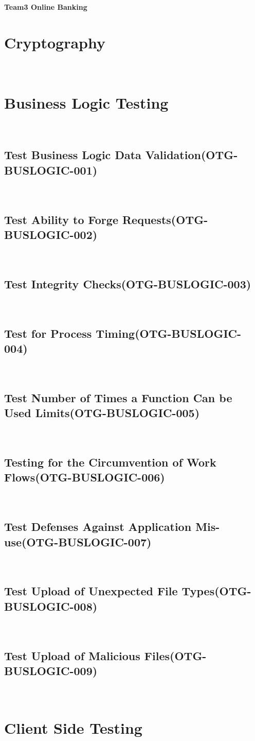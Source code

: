 \documentclass[headsepline,footsepline,footinclude=false,oneside,fontsize=11pt,paper=a4,listof=totoc,bibliography=totoc]{scrbook} %
\begin{document}
\textbf{Team3 Online Banking}


\section{Cryptography}\
 
\pagebreak 
\section{Business Logic Testing}\
\subsection{Test Business Logic Data Validation(OTG-BUSLOGIC-001)}\
\pagebreak 
\subsection{Test Ability to Forge Requests(OTG-BUSLOGIC-002)}\
\pagebreak 
\subsection{Test Integrity Checks(OTG-BUSLOGIC-003)}\
\pagebreak 
\subsection{Test for Process Timing(OTG-BUSLOGIC-004)}\
\pagebreak 
\subsection{Test Number of Times a Function Can be Used Limits(OTG-BUSLOGIC-005)}\
\pagebreak 
\subsection{Testing for the Circumvention of Work Flows(OTG-BUSLOGIC-006)}\
\pagebreak 
\subsection{Test Defenses Against Application Mis-use(OTG-BUSLOGIC-007)}\
\pagebreak 
\subsection{Test Upload of Unexpected File Types(OTG-BUSLOGIC-008)}\
\pagebreak 
\subsection{Test Upload of Malicious Files(OTG-BUSLOGIC-009)}\


\section{Client Side Testing}




\appendix{}

\glsaddall{} %
\printglossaries{}

\printbibliography{}
\end{document}
